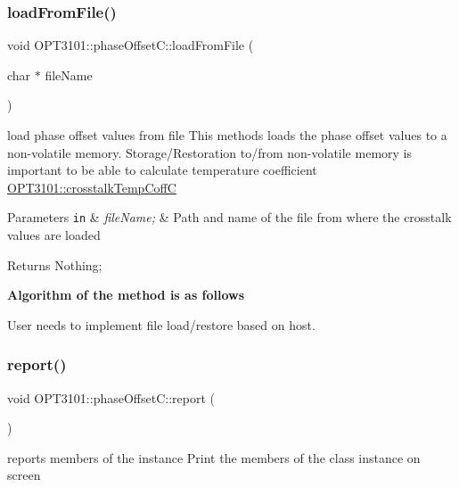 \subsubsection{\texorpdfstring{load\+From\+File()}{loadFromFile()}}
{\footnotesize\ttfamily void O\+P\+T3101\+::phase\+Offset\+C\+::load\+From\+File (\begin{DoxyParamCaption}\item[{char $\ast$}]{file\+Name }\end{DoxyParamCaption})}



load phase offset values from file This methods loads the phase offset values to a non-\/volatile memory. Storage/\+Restoration to/from non-\/volatile memory is important to be able to calculate temperature coefficient \mbox{\hyperlink{class_o_p_t3101_1_1crosstalk_temp_coff_c}{O\+P\+T3101\+::crosstalk\+Temp\+CoffC}} 


\begin{DoxyParams}[1]{Parameters}
\mbox{\tt in}  & {\em file\+Name;} & Path and name of the file from where the crosstalk values are loaded \\
\hline
\end{DoxyParams}
\begin{DoxyReturn}{Returns}
Nothing; 
\end{DoxyReturn}
{\bfseries Algorithm of the method is as follows}


\begin{DoxyItemize}
\item User needs to implement file load/restore based on host. 
\end{DoxyItemize}\mbox{\label{class_o_p_t3101_1_1phase_offset_c_a6baba22699fdb39d45adfd104a44534c}} 
\subsubsection{\texorpdfstring{report()}{report()}}
{\footnotesize\ttfamily void O\+P\+T3101\+::phase\+Offset\+C\+::report (\begin{DoxyParamCaption}{ }\end{DoxyParamCaption})}



reports members of the instance Print the members of the class instance on screen 

